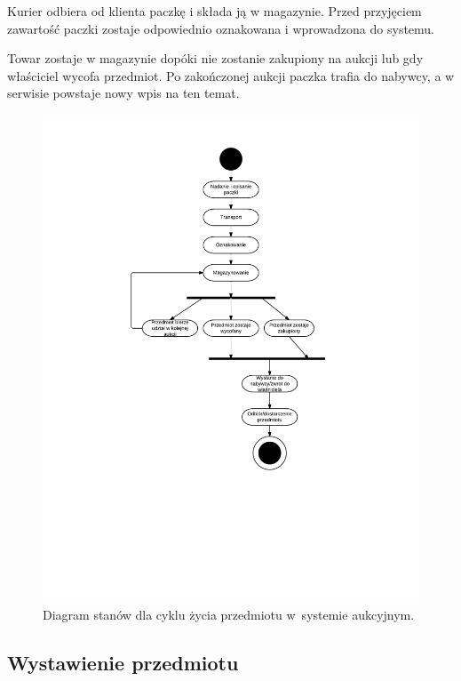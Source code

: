 \documentclass[10pt,a4paper]{article}
\begin{document}
Kurier odbiera od klienta paczkę i składa ją w magazynie. Przed przyjęciem
zawartość paczki zostaje odpowiednio oznakowana i wprowadzona do systemu.

Towar zostaje w magazynie dopóki nie zostanie zakupiony na aukcji lub gdy
właściciel wycofa przedmiot. Po zakończonej aukcji paczka trafia do nabywcy, a
w serwisie powstaje nowy wpis na ten temat.

\newpage
\begin{figure}[p]
  \begin{adjustwidth}{-3cm}{-3cm}
    \centering
    \includegraphics{figury/stan-przedmiot}
    \caption{Diagram stanów dla cyklu życia przedmiotu w~systemie aukcyjnym.}
    \label{fig:stan_przedmiot}
  \end{adjustwidth}
\end{figure}
\clearpage

\subsection{Wystawienie przedmiotu}
\end{document}
